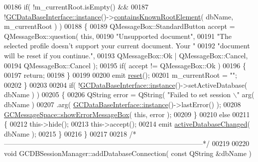 \begin{DoxyCode}
{00186   \textcolor{keywordflow}{if}( !m\_currentRoot.isEmpty() &&
00187       !\hyperlink{class_g_c_data_base_interface_a1baea9c0667aa8b610ec30076fcab84c}{GCDataBaseInterface::instance}()->\hyperlink{class_g_c_data_base_interface_a91183c2d227bf90d0d26fccc1e4ae878}{containsKnownRootElement}( dbName, 
      m\_currentRoot ) )
00188   \{
00189     QMessageBox::StandardButton accept = QMessageBox::question( \textcolor{keyword}{this},
00190                                                                 \textcolor{stringliteral}{"Unsupported
       document"},
00191                                                                 \textcolor{stringliteral}{"The selected
       profile doesn't support your current document. Your "}
00192                                                                 \textcolor{stringliteral}{"document will
       be reset if you continue."},
00193                                                                 QMessageBox::Ok
       | QMessageBox::Cancel,
00194                                                                 
      QMessageBox::Cancel );
00195     \textcolor{keywordflow}{if}( accept != QMessageBox::Ok )
00196     \{
00197       \textcolor{keywordflow}{return};
00198     \}
00199 
00200     emit \hyperlink{class_g_c_d_b_session_manager_add2dc0347405ffb60c4ba057009ead46}{reset}();
00201     m\_currentRoot = \textcolor{stringliteral}{""};
00202   \}
00203 
00204   \textcolor{keywordflow}{if}( !\hyperlink{class_g_c_data_base_interface_a1baea9c0667aa8b610ec30076fcab84c}{GCDataBaseInterface::instance}()->setActiveDatabase( dbName ) )
00205   \{
00206     QString error = QString( \textcolor{stringliteral}{"Failed to set session \(\backslash\)"%
      arg( dbName )
00207                     .arg( \hyperlink{class_g_c_data_base_interface_a1baea9c0667aa8b610ec30076fcab84c}{GCDataBaseInterface::instance}()->lastError() );
00208     \hyperlink{namespace_g_c_message_space_ab118b3a133686167617eb955029fd44e}{GCMessageSpace::showErrorMessageBox}( \textcolor{keyword}{this}, error );
00209   \}
00210   \textcolor{keywordflow}{else}
00211   \{
00212     this->hide();
00213     this->accept();
00214     emit \hyperlink{class_g_c_d_b_session_manager_a47338631e494645f867544a719825311}{activeDatabaseChanged}( dbName );
00215   \}
00216 \}
00217 
00218 \textcolor{comment}{/*
      --------------------------------------------------------------------------------------*/}
00219 
00220 \textcolor{keywordtype}{void} GCDBSessionManager::addDatabaseConnection( \textcolor{keyword}{const} QString &dbName )
}}
\end{DoxyCode}
